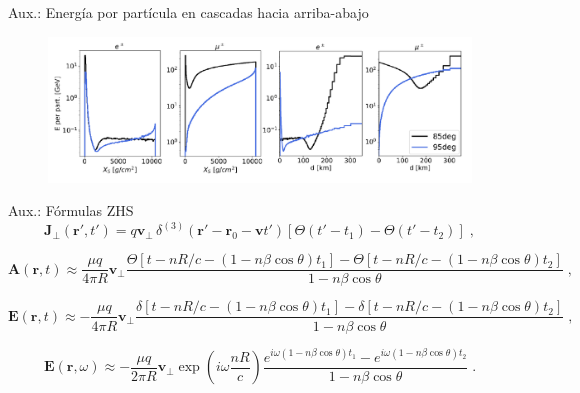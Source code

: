 \documentclass{beamer}
\newcommand{\vect}[1]{\boldsymbol{\mathbf{#1}}}
\begin{document}
\begin{frame}[noframenumbering]{Aux.: Energía por partícula en cascadas hacia arriba-abajo}
			\begin{figure}[H]
		\centering
		\includegraphics[width=1\linewidth]{figures/Egyperpartugdg_slides}
	\end{figure}
\end{frame}
\begin{frame}[noframenumbering]{Aux.: Fórmulas ZHS}
	$$	\vect{J}_\perp\left(\vect{r'}, t'\right)=q\vect{v}_\perp \,\delta^{(3)}\left(\vect{r}'-\vect{r}_0-\vect{v}t'\right)\left[\Theta\left(t'-t_1\right)-\Theta\left(t'-t_2\right)\right]\;,$$
	
	\footnotesize
	$$	\vect{A}\left(\vect{r}, t\right)\approx\frac{\mu q}{4\pi R}\vect{v}_\perp\frac{\Theta\left[t-nR/c-\left(1-n\beta\cos{\theta}\right)t_1\right]-\Theta\left[t-nR/c-\left(1-n\beta\cos{\theta}\right)t_2\right]}{1-n\beta\cos{\theta}}\;,$$
	
	$$\vect{E}\left(\vect{r}, t\right)\approx-\frac{\mu q}{4\pi R}\vect{v}_\perp\frac{\delta\left[t-nR/c-\left(1-n\beta\cos{\theta}\right)t_1\right]-\delta\left[t-nR/c-\left(1-n\beta\cos{\theta}\right)t_2\right]}{1-n\beta\cos{\theta}}\;,$$
	\normalsize
	
	$$\vect{E}\left(\vect{r}, \omega\right)\approx-\frac{\mu q}{2\pi R}\vect{v}_\perp \exp\left(i\omega\frac{nR}{c}\right)\frac{e^{i\omega(1-n\beta\cos{\theta})t_1}-e^{i\omega(1-n\beta\cos{\theta})t_2}}{1-n\beta\cos{\theta}}\;.$$
\end{frame}
\end{document}
